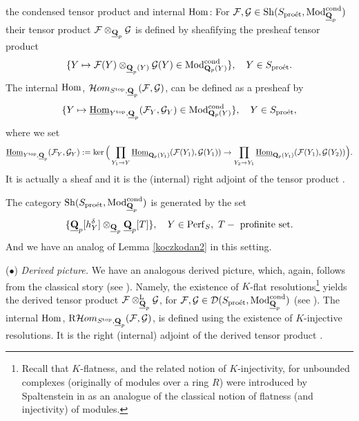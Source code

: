 \documentclass[10pt]{amsart}
\let\cal\mathcal
\theoremstyle{definition}
\theoremstyle{remark}
\newcommand{\proeet}{\operatorname{pro\acute{e}t} }
\newcommand{\Hom}{{\rm{Hom}} }
\newcommand{\uHom}{\underline{{\rm{Hom}} }}
\newcommand{\Hhom}{{\cal Hom}}
\newcommand{\LL}{\operatorname{L} }
\newcommand{\sff}{{\mathcal{F}}}
\newcommand{\sg}{{\mathcal{G}}}
\newcommand{\sd}{{\mathcal{D}}}
\numberwithin{equation}{section}
\def\R{{\mathrm R}}
\def\Q{{\bf Q}} \def\Z{{\bf Z}}
\numberwithin{equation}{section}
\begin{document}
the condensed tensor product and internal $\Hom$: For  $\sff,\sg\in {\rm Sh}(S_{\proeet},{\rm Mod}^{\rm cond}_{\underline{\Q}_p})$ their tensor product  $\sff\otimes_{\underline{\Q}_p}\sg$ is defined by sheafifying the presheaf tensor product
$$
\{Y\mapsto \sff(Y)\otimes_{\underline{\Q}_p(Y)}\sg(Y)\in {\rm Mod}^{\rm cond}_{\Q_p(Y)}\},\quad Y\in S_{\proeet}. 
$$
The internal $\Hom$, $\Hhom_{S^{\rm top},\underline{\Q}_p}(\sff,\sg)$, can be defined  as a presheaf by
$$
\{Y\mapsto  \uHom_{Y^{\rm top},\underline{\Q}_p}(\sff_Y,\sg_Y)\in {\rm Mod}^{\rm cond}_{\Q_p(Y)}\},\quad Y\in S_{\proeet},
$$
where we set 
\begin{equation}\label{coend1a}
\uHom_{Y^{\rm top},\underline{\Q}_{p}}(\sff_Y,\sg_Y)
:=\ker\Big(\prod_{Y_1\to Y}\uHom_{\Q_p(Y_1)}(\sff(Y_1),\sg(Y_1))\to \prod_{Y_2\to Y_1}\uHom_{\Q_p(Y_1)}(\sff(Y_1),\sg(Y_2))\Big).
\end{equation}
It is actually a sheaf \cite[Tag 03EM]{Stck} and it is the (internal)  right adjoint of the tensor product \cite[Tag 03EO]{Stck}.

  The category ${\rm Sh}(S_{\proeet},{\rm Mod}^{\rm cond}_{\underline{\Q}_p})$  is generated by the set 
$$
\{\underline{\Q}_p[h^{\delta}_Y]\otimes_{\underline{\Q}_p}\underline{\Q}_p[T]\}, \quad Y\in {\rm Perf}_S, 
\ T - \mbox{ profinite set}.
$$
And we have an analog of Lemma \ref{koczkodan2} in this setting. 



 \vskip2mm
 ($\bullet$) {\em Derived picture.} We have an analogous derived picture, which, again, follows from the classical story (see \cite[01FQ]{Stck}). Namely, the existence of $K$-flat resolutions\footnote{Recall that $K$-flatness, and the related notion of $K$-injectivity, for unbounded complexes (originally of modules over a ring $R$) were introduced by Spaltenstein  in \cite{Spal} as an analogue of the classical notion of flatness (and injectivity) of modules. }  yields the derived tensor product 
  $\sff\otimes^{\LL}_{\underline{\Q}_p}\sg$, for $\sff, \sg\in\sd(S_{\proeet},{\rm Mod}^{\rm cond}_{\underline{\Q}_p})$ (see \cite[Tag 06YU]{Stck}). The internal $\Hom$, $\R\Hhom_{S^{\rm top},\underline{\Q}_p}(\sff,\sg)$, is defined using the existence of $K$-injective resolutions. It is the right (internal) adjoint of the derived tensor product  \cite[Tag 08J9]{Stck}. 
 
\end{document}

